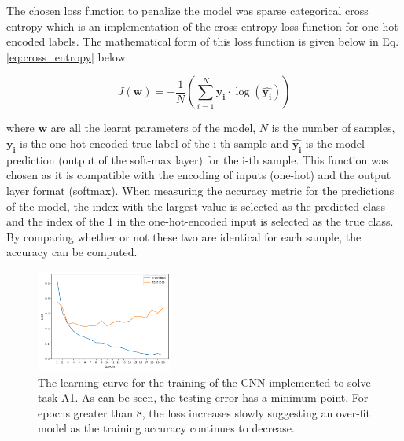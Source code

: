 \documentclass{article}
\begin{document}
    	The chosen loss function to penalize the model was sparse categorical cross entropy which is an implementation of the cross entropy loss function for one hot encoded labels. The mathematical form of this loss function is given below in Eq. \ref{eq:cross_entropy} below:
    	
    	\begin{equation}
    		\label{eq:cross_entropy}
    		J(\boldsymbol{w}) = -\frac{1}{N}\left(\sum_{i=1}^{N}\boldsymbol{y_i}\cdot\log\left(\boldsymbol{\hat{y_i}}\right)\right)
    	\end{equation}
    	
    	where $\boldsymbol{w}$ are all the learnt parameters of the model, $N$ is the number of samples, $\boldsymbol{y_i}$ is the one-hot-encoded true label of the i-th sample and $\boldsymbol{\hat{y_i}}$ is the model prediction (output of the soft-max layer) for the i-th sample. This function was chosen as it is compatible with the encoding of inputs (one-hot) and the output layer format (softmax). When measuring the accuracy metric for the predictions of the model, the index with the largest value is selected as the predicted class and the index of the 1 in the one-hot-encoded input is selected as the true class. By comparing whether or not these two are identical for each sample, the accuracy can be computed.
    	\\
    	
    	\begin{figure}[htb]
    		\centering
    		\includegraphics[width=0.4\textwidth]{a1_learning_curve.png}
    		\caption{The learning curve for the training of the CNN implemented to solve task A1. As can be seen, the testing error has a minimum point. For epochs greater than 8, the loss increases slowly suggesting an over-fit model as the training accuracy continues to decrease.}
    		\label{fig:a1_leraning_curve}
    	\end{figure}
    
\end{document}
